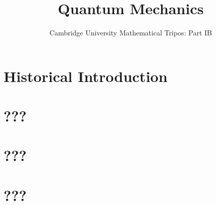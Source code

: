 \documentclass{article}
\title{Quantum Mechanics}
\author{Cambridge University Mathematical Tripos: Part IB}
\begin{document}
\maketitle

\tableofcontentsnewpage{}

\section{Historical Introduction}

\section{???}

\section{???}

\section{???}

\end{document}
